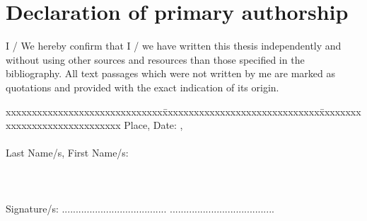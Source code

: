 \chapter{Declaration of primary authorship}
\label{chap:declaration_authorship}

\vspace*{10mm} 

I / We hereby confirm that I / we have written this thesis independently and without using other sources and resources than those specified in the bibliography. All text passages which were not written by me are marked as quotations and provided with the exact indication of its origin. 

\vspace{15mm}

\begin{tabbing}
xxxxxxxxxxxxxxxxxxxxxxxxxxxxxx\=xxxxxxxxxxxxxxxxxxxxxxxxxxxxxx\=xxxxxxxxxxxxxxxxxxxxxxxxxxxxxx\kill
Place, Date:		, \versiondate \\ \\ 
Last Name/s, First Name/s:	 	\> [M\"uster R\"os\"a] \\ \\ \\ \\ 
Signature/s:	\> ......................................\> ...................................... \\
\end{tabbing}
